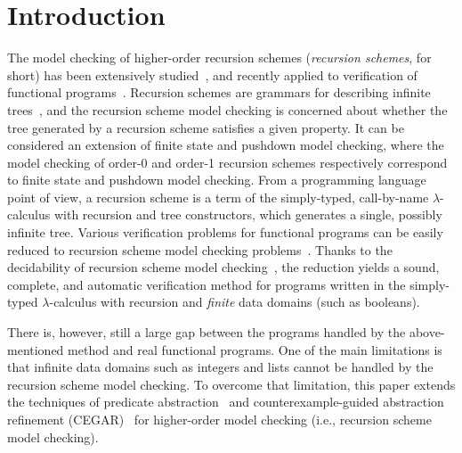\section{Introduction}
\label{sec:intro}

The model checking of higher-order recursion schemes (\emph{recursion 
schemes}, for short) has been extensively 
studied~\cite{Knapik2002,Ong2006,Kobayashi2009a}, and recently applied 
to verification of functional 
programs~\cite{Kobayashi2009,Kobayashi2009c,Kobayashi2010}. Recursion 
schemes are grammars for describing infinite 
trees~\cite{Knapik2002,Ong2006}, and the recursion scheme model checking 
is concerned about whether the tree generated by a recursion scheme 
satisfies a given property.
It can be considered an extension of finite state and pushdown model 
checking, where the model checking of order-0 and order-1 recursion 
schemes respectively correspond to finite state and pushdown model 
checking. From a programming language point of view, a recursion scheme 
is a term of the simply-typed, call-by-name \(\lambda\)-calculus with 
recursion and tree constructors, which generates a single, possibly 
infinite tree. Various verification problems for functional programs
can be easily reduced to recursion scheme model checking 
problems~\cite{Kobayashi2009,Kobayashi2009c,Kobayashi2010}. Thanks to 
the decidability of recursion scheme model checking~\cite{Ong2006}, the 
reduction yields a sound, complete, and automatic verification method 
for programs written in the simply-typed \(\lambda\)-calculus with 
recursion and \emph{finite} data domains (such as booleans).

There is, however, still a large gap between the programs handled by the 
above-mentioned method and real functional programs. One of the main 
limitations is that infinite data domains such as integers and lists 
cannot be handled by the recursion scheme model checking. To overcome 
that limitation, this paper extends the techniques of predicate 
abstraction~\cite{Graf1997} and counterexample-guided abstraction 
refinement (CEGAR)~\cite{Clarke2003a,Ball2002} for higher-order model 
checking (i.e., recursion scheme model checking).

